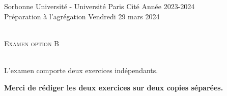 \documentclass[11pt]{article}
\date{}
\author{}
\theoremstyle{exostyle}
\begin{document}


\noindent 
Sorbonne Universit\'e - Université Paris Cité     \hfill   Ann\'ee 2023-2024 \\
Pr\'eparation \`a  l'agr\'egation        \hfill     Vendredi 29 mars 2024 \\ %
\noindent {\rule{\textwidth}{.2mm}}\\[-5mm]
\begin{center}
{\large \textsc{Examen option B} }\\[-5mm]
\end{center}
\noindent {\rule{\textwidth}{.2mm}}\\[1cm]

L’examen comporte deux exercices indépendants.

{\bfseries Merci de r\'ediger les deux exercices sur deux copies s\'epar\'ees.}
\end{document}
